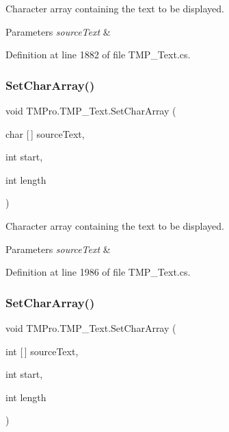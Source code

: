 Character array containing the text to be displayed. 


\begin{DoxyParams}{Parameters}
{\em source\+Text} & \\
\hline
\end{DoxyParams}


Definition at line 1882 of file T\+M\+P\+\_\+\+Text.\+cs.

\mbox{\label{class_t_m_pro_1_1_t_m_p___text_ab92527193dad910ee30c957c5dcd7a16}} 
\subsubsection{\texorpdfstring{SetCharArray()}{SetCharArray()}\hspace{0.1cm}{\footnotesize\ttfamily [2/3]}}
{\footnotesize\ttfamily void T\+M\+Pro.\+T\+M\+P\+\_\+\+Text.\+Set\+Char\+Array (\begin{DoxyParamCaption}\item[{char \mbox{[}$\,$\mbox{]}}]{source\+Text,  }\item[{int}]{start,  }\item[{int}]{length }\end{DoxyParamCaption})}



Character array containing the text to be displayed. 


\begin{DoxyParams}{Parameters}
{\em source\+Text} & \\
\hline
\end{DoxyParams}


Definition at line 1986 of file T\+M\+P\+\_\+\+Text.\+cs.

\mbox{\label{class_t_m_pro_1_1_t_m_p___text_a8938561d5a974e863b79446672b13cd9}} 
\subsubsection{\texorpdfstring{SetCharArray()}{SetCharArray()}\hspace{0.1cm}{\footnotesize\ttfamily [3/3]}}
{\footnotesize\ttfamily void T\+M\+Pro.\+T\+M\+P\+\_\+\+Text.\+Set\+Char\+Array (\begin{DoxyParamCaption}\item[{int \mbox{[}$\,$\mbox{]}}]{source\+Text,  }\item[{int}]{start,  }\item[{int}]{length }\end{DoxyParamCaption})}



